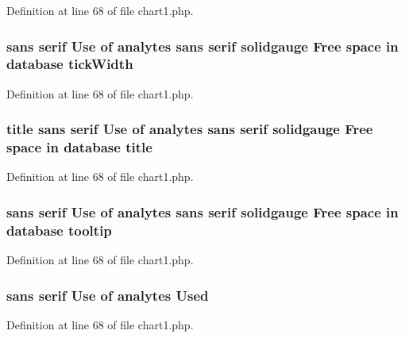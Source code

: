 Definition at line 68 of file chart1.\-php.

\hypertarget{chart1_8php_a7888761877a53c44c36fba3a36a0386c}{
\subsubsection[{tick\-Width}]{ sans serif Use of analytes sans serif solidgauge Free space in database tick\-Width}}\label{chart1_8php_a7888761877a53c44c36fba3a36a0386c}


Definition at line 68 of file chart1.\-php.

\hypertarget{chart1_8php_a256dc75681c13d8a64135187612ba0ee}{
\subsubsection[{title}]{\setlength{\rightskip}{0pt plus 5cm}title sans serif Use of analytes sans serif solidgauge Free space in database title}}\label{chart1_8php_a256dc75681c13d8a64135187612ba0ee}


Definition at line 68 of file chart1.\-php.

\hypertarget{chart1_8php_a2a928e2db41e6fb13386253c6f1d1d3c}{
\subsubsection[{tooltip}]{ sans serif Use of analytes sans serif solidgauge Free space in database tooltip}}\label{chart1_8php_a2a928e2db41e6fb13386253c6f1d1d3c}


Definition at line 68 of file chart1.\-php.

\hypertarget{chart1_8php_a8257e1ad81b4a9ebf5a380357ca8aa0d}{
\subsubsection[{Used}]{ sans serif Use of analytes Used}}\label{chart1_8php_a8257e1ad81b4a9ebf5a380357ca8aa0d}


Definition at line 68 of file chart1.\-php.

